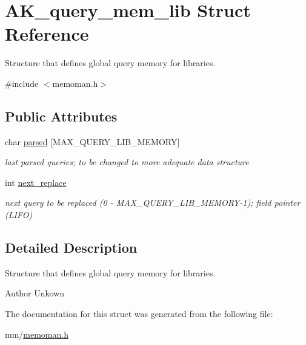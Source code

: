 \hypertarget{structAK__query__mem__lib}{}\section{A\+K\+\_\+query\+\_\+mem\+\_\+lib Struct Reference}
\label{structAK__query__mem__lib}


Structure that defines global query memory for libraries.  




{\ttfamily \#include $<$memoman.\+h$>$}

\subsection*{Public Attributes}
\begin{DoxyCompactItemize}
\item 
char \hyperlink{structAK__query__mem__lib_ad9f1f83f9132d56bfe652891b303f73a}{parsed} \mbox{[}M\+A\+X\+\_\+\+Q\+U\+E\+R\+Y\+\_\+\+L\+I\+B\+\_\+\+M\+E\+M\+O\+RY\mbox{]}\hypertarget{structAK__query__mem__lib_ad9f1f83f9132d56bfe652891b303f73a}{}\label{structAK__query__mem__lib_ad9f1f83f9132d56bfe652891b303f73a}

\begin{DoxyCompactList}\small\item\em last parsed queries; to be changed to more adequate data structure \end{DoxyCompactList}\item 
int \hyperlink{structAK__query__mem__lib_ab7a0a03ba936eabe2a9a11c74fa0d385}{next\+\_\+replace}\hypertarget{structAK__query__mem__lib_ab7a0a03ba936eabe2a9a11c74fa0d385}{}\label{structAK__query__mem__lib_ab7a0a03ba936eabe2a9a11c74fa0d385}

\begin{DoxyCompactList}\small\item\em next query to be replaced (0 -\/ M\+A\+X\+\_\+\+Q\+U\+E\+R\+Y\+\_\+\+L\+I\+B\+\_\+\+M\+E\+M\+O\+R\+Y-\/1); field pointer (L\+I\+FO) \end{DoxyCompactList}\end{DoxyCompactItemize}


\subsection{Detailed Description}
Structure that defines global query memory for libraries. 

\begin{DoxyAuthor}{Author}
Unkown 
\end{DoxyAuthor}


The documentation for this struct was generated from the following file\+:\begin{DoxyCompactItemize}
\item 
mm/\hyperlink{memoman_8h}{memoman.\+h}\end{DoxyCompactItemize}
